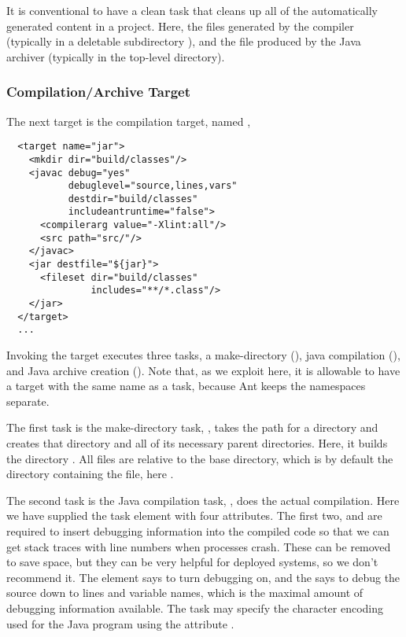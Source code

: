 It is conventional to have a clean task that cleans up all of the
automatically generated content in a project.  Here, the 
files generated by the compiler (typically in a deletable subdirectory
), and the  file produced by the Java archiver
(typically in the top-level directory).

\subsubsection{Compilation/Archive Target}

The next target is the compilation target, named ,

\begin{verbatim}
  <target name="jar">
    <mkdir dir="build/classes"/>
    <javac debug="yes"
           debuglevel="source,lines,vars"
           destdir="build/classes"
           includeantruntime="false">
      <compilerarg value="-Xlint:all"/>
      <src path="src/"/>
    </javac>
    <jar destfile="${jar}">
      <fileset dir="build/classes"
               includes="**/*.class"/>
    </jar>
  </target>
  ...
\end{verbatim}
%
Invoking the  target executes three tasks, a make-directory
(), java compilation (), and Java archive
creation ().  Note that, as we exploit here, it is
allowable to have a target with the same name as a task, because Ant
keeps the namespaces separate.

The first task is the make-directory task, , takes the
path for a directory and creates that directory and all of its
necessary parent directories.  Here, it builds the directory
.  All files are relative to the base
directory, which is by default the directory containing the
 file, here .

The second task is the Java compilation task, , does the
actual compilation.  Here we have supplied the task element with four
attributes.  The first two,  and  are
required to insert debugging information into the compiled code so
that we can get stack traces with line numbers when processes crash.
These can be removed to save space, but they can be very helpful for
deployed systems, so we don't recommend it.  The  element
says to turn debugging on, and the  says to debug the
source down to lines and variable names, which is the maximal amount
of debugging information available.  The  task may specify
the character encoding used for the Java program using the attribute
.


